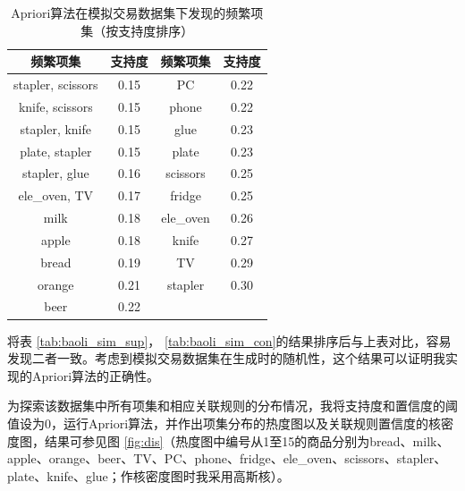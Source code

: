 \documentclass[12pt,a4paper]{article}
\theoremstyle{definition}
\begin{document}
\vspace{-0.03\linewidth}
\begin{table}[H]
	\renewcommand\arraystretch{1.35}
	\caption{Apriori算法在模拟交易数据集下发现的频繁项集（按支持度排序）}
	\label{tab:apriori_sim_sup}
	\centering
	
	\begin{tabular}{c|c|c|c}
		\centering
		频繁项集 & 支持度 & 频繁项集 & 支持度 \\
		\hline
		stapler, scissors & 0.15 & PC & 0.22 \\
		knife, scissors & 0.15 & phone & 0.22 \\
		stapler, knife & 0.15 & glue & 0.23 \\
		plate, stapler & 0.15 &plate & 0.23 \\
		stapler, glue & 0.16 & scissors & 0.25 \\
		ele\_oven, TV & 0.17 & fridge & 0.25 \\
		milk & 0.18 & ele\_oven & 0.26 \\
		apple & 0.18 & knife & 0.27 \\
		bread & 0.19 & TV & 0.29 \\
		orange & 0.21 & stapler & 0.30 \\
		beer & 0.22 & & \\		
	\end{tabular}
\end{table}

\vspace{-0.02\linewidth}
将表 \ref{tab:baoli_sim_sup}， \ref{tab:baoli_sim_con}的结果排序后与上表对比，容易发现二者一致。考虑到模拟交易数据集在生成时的随机性，这个结果可以证明我实现的Apriori算法的正确性。

为探索该数据集中所有项集和相应关联规则的分布情况，我将支持度和置信度的阈值设为0，运行Apriori算法，并作出项集分布的热度图以及关联规则置信度的核密度图，结果可参见图 \ref{fig:dis}（热度图中编号从1至15的商品分别为bread、milk、apple、orange、beer、TV、PC、phone、fridge、ele\_oven、scissors、stapler、plate、knife、glue；作核密度图时我采用高斯核）。
\end{document}
